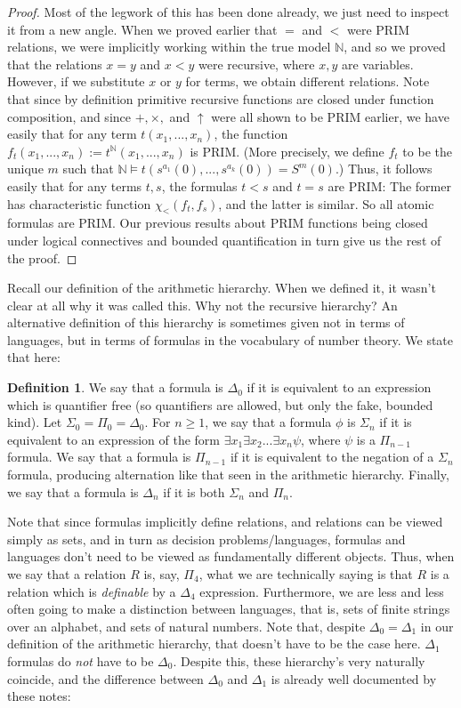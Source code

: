 \documentclass{article}
\theoremstyle{definition}
\newtheorem{definition}{Definition}[section]
\theoremstyle{plain}
\theoremstyle{theorem}
\begin{document}
\begin{proof}
    Most of the legwork of this has been done already, we just need to inspect it from a new angle. When we proved earlier that $=$ and $<$ were PRIM relations, we were implicitly working within the true model $\mathbb{N}$, and so we proved that the relations $x = y$ and $x < y$ were recursive, where $x,y$ are variables. However, if we substitute $x$ or $y$ for terms, we obtain different relations. Note that since by definition primitive recursive functions are closed under function composition, and since $+,\times,$ and $\uparrow$ were all shown to be PRIM earlier, we have easily that for any term $t(x_1,...,x_n)$, the function $f_t(x_1,...,x_n) := t^{\mathbb{N}}(x_1,...,x_n)$ is PRIM. (More precisely, we define $f_t$ to be the unique $m$ such that $\mathbb{N} \models t(s^{a_1}(0),...,s^{a_k}(0)) = S^m(0)$.) Thus, it follows easily that for any terms $t,s$, the formulas $t < s$ and $t = s$ are PRIM: The former has characteristic function $\chi_<(f_t,f_s)$, and the latter is similar. So all atomic formulas are PRIM. Our previous results about PRIM functions being closed under logical connectives and bounded quantification in turn give us the rest of the proof. 
\end{proof}
Recall our definition of the arithmetic hierarchy. When we defined it, it wasn't clear at all why it was called this. Why not the recursive hierarchy? An alternative definition of this hierarchy is sometimes given not in terms of languages, but in terms of formulas in the vocabulary of number theory. We state that here:
\begin{definition}
    We say that a formula is $\Delta_0$ if it is equivalent to an expression which is quantifier free (so quantifiers are allowed, but only the fake, bounded kind). Let $\Sigma_0 = \Pi_0 = \Delta_0$. For $n \geq 1$, we say that a formula $\phi$ is $\Sigma_n$ if it is equivalent to an expression of the form $\exists x_1 \exists x_2 ... \exists x_n \psi$, where $\psi$ is a $\Pi_{n-1}$ formula. We say that a formula is $\Pi_{n-1}$ if it is equivalent to the negation of a $\Sigma_n$ formula, producing alternation like that seen in the arithmetic hierarchy. Finally, we say that a formula is $\Delta_n$ if it is both $\Sigma_n$ and $\Pi_n$.
\end{definition}
Note that since formulas implicitly define relations, and relations can be viewed simply as sets, and in turn as decision problems/languages, formulas and languages don't need to be viewed as fundamentally different objects. Thus, when we say that a relation $R$ is, say, $\Pi_4$, what we are technically saying is that $R$ is a relation which is \textit{definable} by a $\Delta_4$ expression. Furthermore, we are less and less often going to make a distinction between languages, that is, sets of finite strings over an alphabet, and sets of natural numbers. Note that, despite $\Delta_0 = \Delta_1$ in our definition of the arithmetic hierarchy, that doesn't have to be the case here. $\Delta_1$ formulas do \textit{not} have to be $\Delta_0$. Despite this, these hierarchy's very naturally coincide, and the difference between $\Delta_0$ and $\Delta_1$ is already well documented by these notes:
\end{document}
